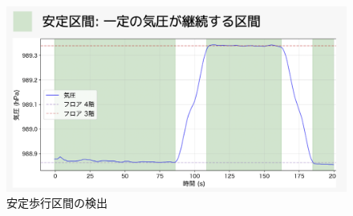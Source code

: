 

\begin{figure}[h]
	\centering
	\includegraphics[width=\linewidth]{../image/stable.jpg}
	\caption{安定歩行区間の検出}    \label{fig:stable_section}
\end{figure}



